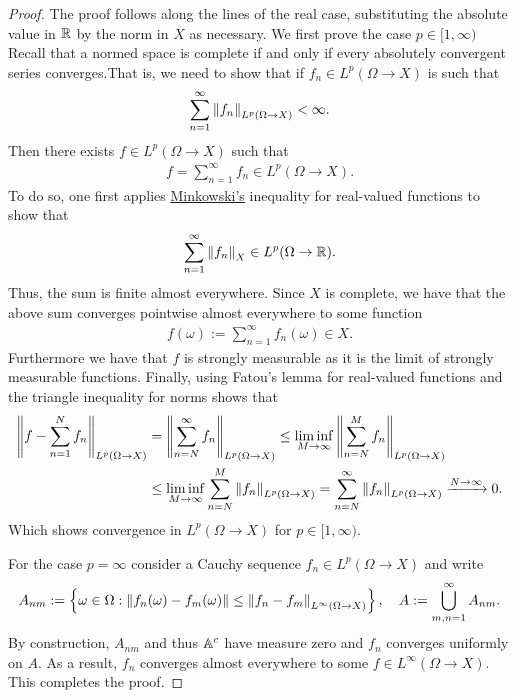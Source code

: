 \documentclass[
    a4paper,
    DIV=14,
    abstract=true,
    numbers=noenddot
]{scrartcl}
\begin{document}
\begin{proof}
	The proof follows along the lines of the real case, substituting the absolute value in $\mathbb{R}$ by the norm in $X$ as necessary. We first prove the case $p \in [1,\infty)$ Recall that a normed space is complete if and only if every absolutely convergent series converges.That is, we need to show that if $f_n \in L^p(\Omega \to X)$ is such that
	\begin{align*}
		\sum_{n=1}^\infty \left\lVert f_n \right\rVert_{L^p(\Omega\to X)}<\infty.
	\end{align*}
	Then there exists $f\in L^p(\Omega\to X)$ such that
	\begin{align*}
		f=\sum_{n=1}^\infty f_n\in L^p(\Omega\to X).
	\end{align*}
	To do so, one first applies \href{https://en.wikipedia.org/wiki/Minkowski_inequality#:~:text=.-,Minkowski%27s,-integral%20inequality%5B}{Minkowski's} inequality for real-valued functions to show that
	\begin{align*}
		\sum_{n=1}^\infty \left\lVert f_n \right\rVert_X\in L^p(\Omega\to\mathbb{R}).
	\end{align*}
	Thus, the sum is finite almost everywhere. Since $X$ is complete, we have that the above sum converges pointwise almost everywhere to some function
	\begin{align*}
		f(\omega):=\sum_{n=1}^\infty f_n(\omega)\in X.
	\end{align*}
	Furthermore we have that $f$ is strongly measurable as it is the limit of strongly measurable functions. Finally, using Fatou's lemma for real-valued functions and the triangle inequality for norms shows that
	\begin{align*}
		\left\lVert f-\sum_{n=1}^N f_n \right\rVert_{L^p(\Omega\to X)} & =\left\lVert \sum_{n=N}^\infty f_n \right\rVert_{L^p(\Omega\to X)}\leq \liminf_{M\to \infty}\left\lVert \sum_{n=N}^M f_n \right\rVert_{L^p(\Omega\to X)} \\&\leq \liminf_{M\to \infty}\sum_{n=N}^M \left\lVert f_n \right\rVert_{L^p(\Omega\to X)}=\sum_{n=N}^\infty \left\lVert f_n \right\rVert_{L^p(\Omega\to X)}\xrightarrow{N\to\infty} 0.
	\end{align*}
	Which shows convergence in $L^p(\Omega\to X)$ for $p\in [1,\infty)$.

	For the case $p=\infty$ consider a Cauchy sequence $f_n \in L^p(\Omega \to X)$ and write
	\begin{align*}
		A_{nm}:=\left\{\omega\in \Omega: \left\lVert f_n(\omega)-f_m(\omega) \right\rVert \leq\left\lVert f_n-f_m \right\rVert_{L^\infty(\Omega \to X)}\right\}, \quad A := \bigcup_{m,n=1}^\infty A_{nm}.
	\end{align*}
	By construction, $ A_{nm}$ and thus $\mathbb{A}^c$ have measure zero and $f_n$ converges uniformly on $A$. As a result, $f_n$ converges almost everywhere to some $f\in L^\infty(\Omega\to X)$. This completes the proof.

\end{proof}
\end{document}
